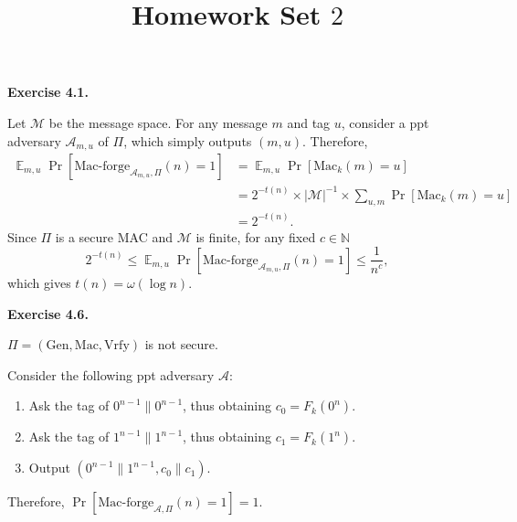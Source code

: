 \documentclass[a4paper]{article}
\title{Homework Set $2$}
\date{}
\newenvironment{exercise}[1]{
	\par
	\noindent\textbf{Exercise #1.}\quad
}{
	\par
	\bigskip
}
\newcommand{\E}[1]{\mathop{\mathbb E}_{#1}}
\newcommand{\sbra}[1]{\left[ #1 \right]}
\newcommand{\Gen}{\mathrm{Gen}}
\newcommand{\Mac}{\mathrm{Mac}}
\newcommand{\Vrfy}{\mathrm{Vrfy}}
\newcommand{\Macforge}{\mathrm{Mac}\text{-}\mathrm{forge}}
\newcommand{\ppt}{{\sc ppt} }
\begin{document}
\maketitle

\begin{exercise}{4.1}
    Let $\mathcal M$ be the message space.
    For any message $m$ and tag $u$, 
    consider a \ppt adversary $\mathcal A_{m,u}$ of $\Pi$, which simply outputs $(m,u)$.
    Therefore,
    \begin{align*}
        \E{m,u}\Pr\sbra{\Macforge_{\mathcal A_{m,u},\Pi}(n)=1}
        &=\E{m,u}\Pr\sbra{\Mac_k(m)=u}\\
        &=2^{-t(n)}\times|\mathcal M|^{-1}\times\sum_{u,m}\Pr\sbra{\Mac_k(m)=u}\\
        &=2^{-t(n)}.
    \end{align*}
    Since $\Pi$ is a secure MAC and $\mathcal M$ is finite, for any fixed $c\in\mathbb N$
    $$
    2^{-t(n)}\leq\E{m,u}\Pr\sbra{\Macforge_{\mathcal A_{m,u},\Pi}(n)=1}\leq\frac{1}{n^c},
    $$
    which gives $t(n)=\omega(\log n)$.
\end{exercise}

\begin{exercise}{4.6}
    $\Pi=(\Gen,\Mac,\Vrfy)$ is not secure.

    Consider the following \ppt adversary $\mathcal A$:
    \begin{enumerate}
        \item Ask the tag of $0^{n-1}\|0^{n-1}$, thus obtaining $c_0=F_k(0^n)$.
        \item Ask the tag of $1^{n-1}\|1^{n-1}$, thus obtaining $c_1=F_k(1^n)$.
        \item Output $(0^{n-1}\|1^{n-1},c_0\|c_1)$.
    \end{enumerate}
    Therefore, $\Pr\sbra{\Macforge_{\mathcal A,\Pi}(n)=1}=1$.
\end{exercise}
\end{document}
